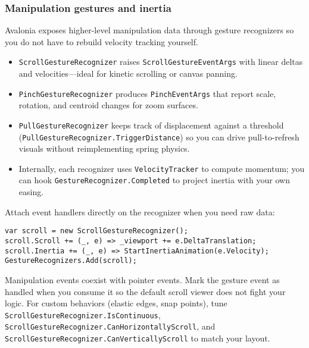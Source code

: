 \subsubsection{Manipulation gestures and
inertia}\label{manipulation-gestures-and-inertia}

Avalonia exposes higher-level manipulation data through gesture
recognizers so you do not have to rebuild velocity tracking yourself.

\begin{itemize}
\tightlist
\item
  \passthrough{\lstinline!ScrollGestureRecognizer!} raises
  \passthrough{\lstinline!ScrollGestureEventArgs!} with linear deltas
  and velocities---ideal for kinetic scrolling or canvas panning.
\item
  \passthrough{\lstinline!PinchGestureRecognizer!} produces
  \passthrough{\lstinline!PinchEventArgs!} that report scale, rotation,
  and centroid changes for zoom surfaces.
\item
  \passthrough{\lstinline!PullGestureRecognizer!} keeps track of
  displacement against a threshold
  (\passthrough{\lstinline!PullGestureRecognizer.TriggerDistance!}) so
  you can drive pull-to-refresh visuals without reimplementing spring
  physics.
\item
  Internally, each recognizer uses
  \passthrough{\lstinline!VelocityTracker!} to compute momentum; you can
  hook \passthrough{\lstinline!GestureRecognizer.Completed!} to project
  inertia with your own easing.
\end{itemize}

Attach event handlers directly on the recognizer when you need raw data:

\begin{lstlisting}
var scroll = new ScrollGestureRecognizer();
scroll.Scroll += (_, e) => _viewport += e.DeltaTranslation;
scroll.Inertia += (_, e) => StartInertiaAnimation(e.Velocity);
GestureRecognizers.Add(scroll);
\end{lstlisting}

Manipulation events coexist with pointer events. Mark the gesture event
as handled when you consume it so the default scroll viewer does not
fight your logic. For custom behaviors (elastic edges, snap points),
tune \passthrough{\lstinline!ScrollGestureRecognizer.IsContinuous!},
\passthrough{\lstinline!ScrollGestureRecognizer.CanHorizontallyScroll!},
and
\passthrough{\lstinline!ScrollGestureRecognizer.CanVerticallyScroll!} to
match your layout.

